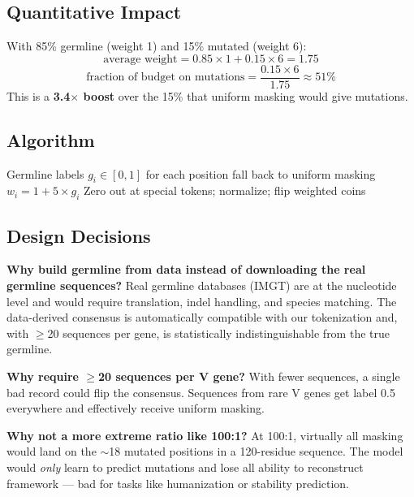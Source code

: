 \documentclass[11pt]{article}
\begin{document}
\subsection{Quantitative Impact}
With 85\% germline (weight 1) and 15\% mutated (weight 6):
\[
\text{average weight} = 0.85 \times 1 + 0.15 \times 6 = 1.75
\]
\[
\text{fraction of budget on mutations} = \frac{0.15 \times 6}{1.75} \approx 51\%
\]
This is a \textbf{3.4$\times$ boost} over the 15\% that uniform
masking would give mutations.

\subsection{Algorithm}
\begin{algorithm}[H]
\caption{Germline Masking}
\begin{algorithmic}[1]
\Require Germline labels $g_i \in [0, 1]$ for each position
    \State fall back to uniform masking
\EndIf
\State $w_i = 1 + 5 \times g_i$
\State Zero out at special tokens; normalize; flip weighted coins
\end{algorithmic}
\end{algorithm}

\subsection{Design Decisions}

\textbf{Why build germline from data instead of downloading the
real germline sequences?}
Real germline databases (IMGT) are at the nucleotide level and
would require translation, indel handling, and species matching.
The data-derived consensus is automatically compatible with our
tokenization and, with $\geq$20 sequences per gene, is
statistically indistinguishable from the true germline.

\textbf{Why require $\geq$20 sequences per V gene?}
With fewer sequences, a single bad record could flip the
consensus. Sequences from rare V genes get label 0.5 everywhere
and effectively receive uniform masking.

\textbf{Why not a more extreme ratio like 100:1?}
At 100:1, virtually all masking would land on the $\sim$18
mutated positions in a 120-residue sequence. The model would
\emph{only} learn to predict mutations and lose all ability to
reconstruct framework --- bad for tasks like humanization or
stability prediction.

\end{document}

